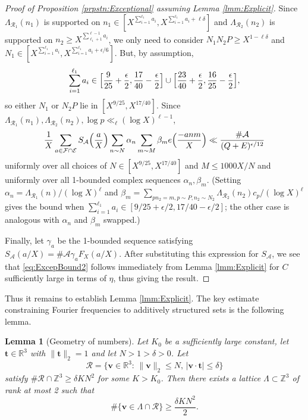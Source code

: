 \documentclass[10pt]{amsart}
\theoremstyle{plain}
\newtheorem{lmm}[thrm]{Lemma}
\numberwithin{sblmm}{thrm}
\numberwithin{equation}{section}
\begin{document}
\begin{proof}[Proof of Proposition \ref{prpstn:Exceptional} assuming  Lemma \ref{lmm:Explicit}]
Since $\Lambda_{\mathcal{R}_1}(n_1)$ is supported on $n_1\in[X^{\sum_{i=1}^{\ell_1}a_i},X^{\sum_{i=1}^{\ell_1}a_i+\ell\delta}]$ and $\Lambda_{\mathcal{R}_2}(n_2)$ is supported on $n_2\ge X^{\sum_{\ell_1+1}^{\ell-1}a_i}$, we only need to consider $N_1N_2P\ge X^{1-\ell\delta}$ and $N_1\in [X^{\sum_{i=1}^{\ell_1}a_i},X^{\sum_{i=1}^{\ell_1}a_i+\epsilon/6}]$. But, by assumption, 
\[
\sum_{i=1}^{\ell_1}a_i\in \Bigl[\frac{9}{25}+\frac{\epsilon}{2},\frac{17}{40}-\frac{\epsilon}{2}\Bigr]\cup\Bigl[\frac{23}{40}+\frac{\epsilon}{2},\frac{16}{25}-\frac{\epsilon}{2}\Bigr],
\]
 so either $N_1$ or $N_2 P$ lie in $[X^{9/25},X^{17/40}]$. Since $\Lambda_{\mathcal{R}_1}(n_1),\Lambda_{\mathcal{R}_2}(n_2),\log{p}\ll_\ell (\log{X})^{\ell-1}$, %
%
\begin{align}
\frac{1}{X}\sum_{a\in\mathcal{F}\cap\mathcal{E}}S_{\mathcal{A}}\Bigl(\frac{a}{X}\Bigr)\sum_{n\sim N}\alpha_n\sum_{m\sim M}\beta_m e\Bigl(\frac{-an m}{X}\Bigr)
\ll \frac{\#\mathcal{A}}{(Q+E)^{\epsilon/12}}
\label{eq:ExcepBound2}
\end{align}
%
uniformly over all choices of $N\in [X^{9/25},X^{17/40}]$ and $M\le 1000 X/N$ and uniformly over all 1-bounded complex sequences $\alpha_n,\beta_m$. (Setting $\alpha_n=\Lambda_{\mathcal{R}_1}(n)/(\log{X})^{\ell}$ and $\beta_m=\sum_{p n_2=m, p\sim P, n_2\sim N_2}\Lambda_{\mathcal{R}_2}(n_2)c_p/(\log{X})^{\ell}$ gives the bound when $\sum_{i=1}^{\ell_1}a_i\in [9/25+\epsilon/2,17/40-\epsilon/2]$; the other case is analogous with $\alpha_n$ and $\beta_m$ swapped.)

Finally, let $\gamma_a$ be the 1-bounded sequence satisfying $S_{\mathcal{A}}(a/X)=\#\mathcal{A}\gamma_a F_X(a/X)$. After substituting this expression for $S_\mathcal{A}$, we see that \eqref{eq:ExcepBound2} follows immediately from  Lemma \ref{lmm:Explicit} for $C$ sufficiently large in terms of $\eta$, thus giving the result.
\end{proof}
%
%
%
%
Thus it remains to establish Lemma \ref{lmm:Explicit}. The key estimate constraining Fourier frequencies to additively structured sets is the following lemma.
%
%
%
%
\begin{lmm}[Geometry of numbers] \label{lmm:GeometryOfNumbers}
%
Let $K_0$ be a sufficiently large constant, let $\mathbf{t}\in\mathbb{R}^3$ with $\|\mathbf{t}\|_2=1$ and let $N>1>\delta>0$. Let
\[
\mathcal{R}=\{\mathbf{v}\in\mathbb{R}^3:\,\|\mathbf{v}\|_2\le N,\,|\mathbf{v}\cdot\mathbf{t}|\le \delta\}
\]
satisfy $\#\mathcal{R}\cap\mathbb{Z}^3\ge \delta K N^2$ for some $K>K_0$. Then there exists a lattice $\Lambda\subset\mathbb{Z}^3$ of rank at most 2 such that
\[
\#\{\mathbf{v}\in\Lambda\cap\mathcal{R}\}\ge \frac{\delta K N^2}{2}.
\]
%
\end{lmm}
\end{document}
